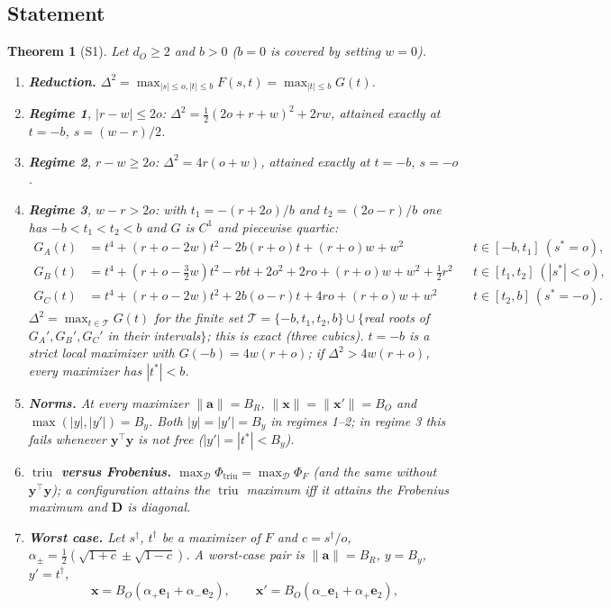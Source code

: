 \documentclass[11pt]{article}
\theoremstyle{definition}
\theoremstyle{plain}
\newtheorem{theorem}[definition]{Theorem}
\newcommand{\by}{\mathbf{y}}
\newcommand{\bx}{\mathbf{x}}
\DeclareMathOperator{\triu}{triu}
\newcommand{\bD}{\mathbf{D}}
\newcommand{\ba}{\mathbf{a}}
\newcommand{\be}{\mathbf{e}}
\begin{document}
\subsection{Statement}

\begin{theorem}[S1]\label{thm:S1}
Let $d_O\ge2$ and $b>0$ ($b=0$ is covered by setting $w=0$).
\begin{enumerate}[label=(\roman*),nosep]
  \item \textbf{Reduction.} $\Delta^2=\max_{|s|\le o,|t|\le b}F(s,t)=\max_{|t|\le b}G(t)$.
  \item \textbf{Regime 1}, $|r-w|\le2o$: $\Delta^2=\tfrac12(2o+r+w)^2+2rw$, attained exactly at $t=-b$, $s=(w-r)/2$.
  \item \textbf{Regime 2}, $r-w\ge2o$: $\Delta^2=4r(o+w)$, attained exactly at $t=-b$, $s=-o$.
  \item \textbf{Regime 3}, $w-r>2o$: with $t_1=-(r+2o)/b$ and $t_2=(2o-r)/b$ one has $-b<t_1<t_2<b$ and $G$ is $C^1$ and piecewise quartic:
  \begin{align*}
    G_A(t)&=t^4+(r+o-2w)t^2-2b(r+o)t+(r+o)w+w^2 && t\in[-b,t_1]\ (s^*=o),\\
    G_B(t)&=t^4+(r+o-\tfrac32w)t^2-rbt+2o^2+2ro+(r+o)w+w^2+\tfrac12r^2 && t\in[t_1,t_2]\ (|s^*|<o),\\
    G_C(t)&=t^4+(r+o-2w)t^2+2b(o-r)t+4ro+(r+o)w+w^2 && t\in[t_2,b]\ (s^*=-o).
  \end{align*}
  $\Delta^2=\max_{t\in\mathcal T}G(t)$ for the finite set $\mathcal T=\{-b,t_1,t_2,b\}\cup\{$real roots of $G_A',G_B',G_C'$ in their intervals$\}$; this is exact (three cubics). $t=-b$ is a strict local maximizer with $G(-b)=4w(r+o)$; if $\Delta^2>4w(r+o)$, every maximizer has $|t^*|<b$.
  \item \textbf{Norms.} At every maximizer $\|\ba\|=B_R$, $\|\bx\|=\|\bx'\|=B_O$ and $\max(|y|,|y'|)=B_y$. Both $|y|=|y'|=B_y$ in regimes 1--2; in regime 3 this fails whenever $\by^\top\by$ is not free ($|y'|=|t^*|<B_y$).
  \item \textbf{$\triu$ versus Frobenius.} $\max_{\mathcal D}\Phi_{\triu}=\max_{\mathcal D}\Phi_F$ (and the same without $\by^\top\by$); a configuration attains the $\triu$ maximum iff it attains the Frobenius maximum and $\bD$ is diagonal.
  \item \textbf{Worst case.} Let $s^\dagger$, $t^\dagger$ be a maximizer of $F$ and $c=s^\dagger/o$, $\alpha_\pm=\tfrac12(\sqrt{1+c}\pm\sqrt{1-c})$. A worst-case pair is $\|\ba\|=B_R$, $y=B_y$, $y'=t^\dagger$,
  \[
     \bx=B_O(\alpha_+\be_1+\alpha_-\be_2),\qquad \bx'=B_O(\alpha_-\be_1+\alpha_+\be_2),
\]
\end{enumerate}
\end{theorem}
\end{document}
